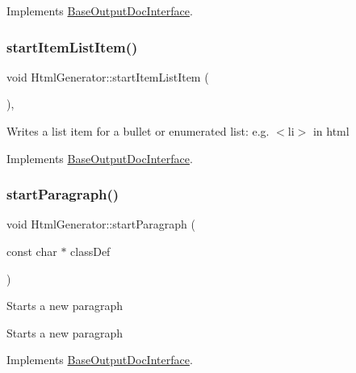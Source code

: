 Implements \mbox{\hyperlink{class_base_output_doc_interface_a54b169393594b6cf113977ccccaeb9ee}{Base\+Output\+Doc\+Interface}}.

\mbox{\label{class_html_generator_aaa5091e04c77ea310e0c5dee4cc04e94}} 
\subsubsection{\texorpdfstring{startItemListItem()}{startItemListItem()}}
{\footnotesize\ttfamily void Html\+Generator\+::start\+Item\+List\+Item (\begin{DoxyParamCaption}{ }\end{DoxyParamCaption})\hspace{0.3cm}{\ttfamily [inline]}, {\ttfamily [virtual]}}

Writes a list item for a bullet or enumerated list\+: e.\+g. {\ttfamily $<$li$>$} in html 

Implements \mbox{\hyperlink{class_base_output_doc_interface_aa1cbcadfedf8e6d52029d17526b5fa3f}{Base\+Output\+Doc\+Interface}}.

\mbox{\label{class_html_generator_ab00abe0fbb8b668d3f8fd73b7c1216b0}} 
\subsubsection{\texorpdfstring{startParagraph()}{startParagraph()}}
{\footnotesize\ttfamily void Html\+Generator\+::start\+Paragraph (\begin{DoxyParamCaption}\item[{const char $\ast$}]{class\+Def }\end{DoxyParamCaption})\hspace{0.3cm}{\ttfamily [virtual]}}

Starts a new paragraph

Starts a new paragraph 

Implements \mbox{\hyperlink{class_base_output_doc_interface_a9f711f4ef8f48b9c7b1cae625578e7ff}{Base\+Output\+Doc\+Interface}}.

\mbox{\label{class_html_generator_ae3174a7318289e8f7042f2d10345c419}} 
